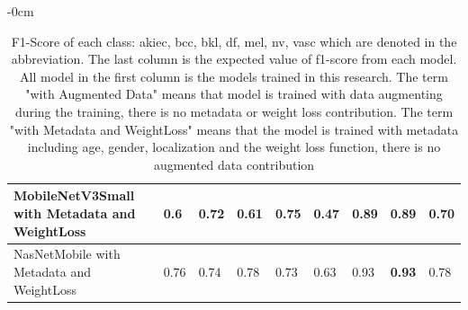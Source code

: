 \documentclass[sensors,article,submit,pdftex,moreauthors]{Definitions/mdpi}
\begin{document}
\begin{adjustwidth}{-\extralength}{0cm}
\begin{table}[H]
\begin{tabular}{|p{5cm} | p{0.6cm} | p{0.6cm} | p{0.6cm} | p{0.6cm} | p{0.6cm} | p{0.6cm} | p{0.6cm} | p{0.7cm}|}
		\hline
		MobileNetV3Small with Metadata and WeightLoss & 0.6 & 0.72 & 0.61 & 0.75 & 0.47 & 0.89 & \textbf{0.89} & 0.70\\
		\hline
		NasNetMobile with Metadata and WeightLoss & 0.76 & 0.74 & 0.78 & 0.73 & 0.63 & 0.93 & \textbf{0.93} & 0.78\\
		\hline
	\end{tabular}
	\caption{F1-Score of each class: akiec, bcc, bkl, df, mel, nv, vasc which are denoted in the abbreviation. The last column is the expected value of f1-score from each model. All model in the first column is the models trained in this research. The term "with Augmented Data" means that model is trained with data augmenting during the training, there is no metadata or weight loss contribution. The term "with Metadata and WeightLoss" means that the model is trained with metadata including age, gender, localization and the weight loss function, there is no augmented data contribution}
	\label{appendix-table:F1-score-summary}
\end{table}


\end{adjustwidth}
\end{document}
